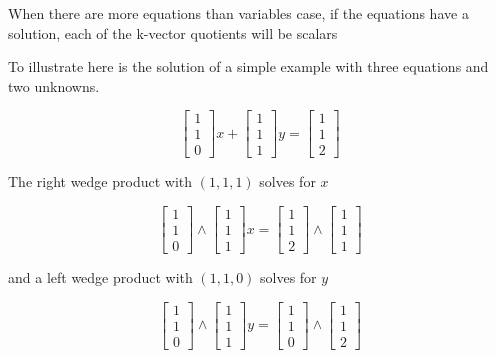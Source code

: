 \documentclass{article}      %
\begin{document}
When there are more equations than variables case, if the equations have a solution, each of the k-vector quotients will be scalars

To illustrate here is the solution of a simple example with three equations and two unknowns.  

\[
\begin{bmatrix}
1 \\ 1 \\ 0
\end{bmatrix}
x
+ 
\begin{bmatrix}
1 \\ 1 \\ 1
\end{bmatrix}
y
= 
\begin{bmatrix}
1 \\ 1 \\ 2
\end{bmatrix}
\]

The right wedge product with $(1, 1, 1)$ solves for $x$

\[
\begin{bmatrix}
1 \\ 1 \\ 0
\end{bmatrix}
\wedge
\begin{bmatrix}
1 \\ 1 \\ 1
\end{bmatrix}
x
= 
\begin{bmatrix}
1 \\ 1 \\ 2
\end{bmatrix}
\wedge
\begin{bmatrix}
1 \\ 1 \\ 1
\end{bmatrix}
\]

and a left wedge product with $(1, 1, 0)$ solves for $y$

\[
\begin{bmatrix}
1 \\ 1 \\ 0
\end{bmatrix}
\wedge
\begin{bmatrix}
1 \\ 1 \\ 1
\end{bmatrix}
y
= 
\begin{bmatrix}
1 \\ 1 \\ 0
\end{bmatrix}
\wedge
\begin{bmatrix}
1 \\ 1 \\ 2
\end{bmatrix}
\]
\end{document}
